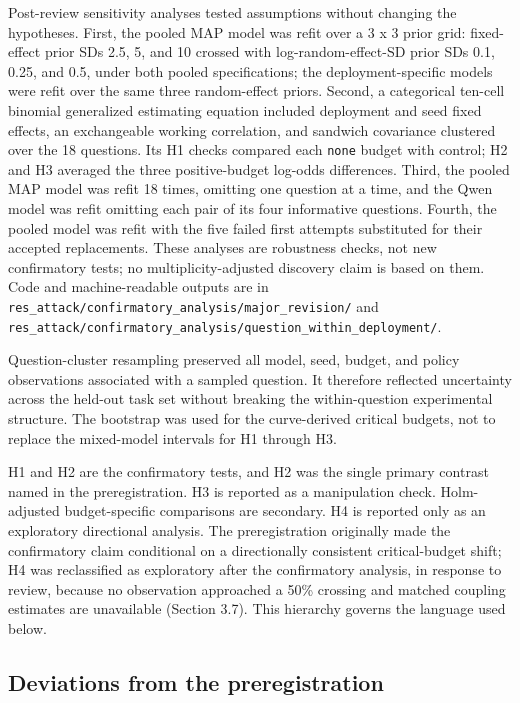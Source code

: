 \documentclass[11pt]{article}
\begin{document}
Post-review sensitivity analyses tested assumptions without changing the hypotheses. First, the pooled MAP model was refit over a 3 x 3 prior grid: fixed-effect prior SDs 2.5, 5, and 10 crossed with log-random-effect-SD prior SDs 0.1, 0.25, and 0.5, under both pooled specifications; the deployment-specific models were refit over the same three random-effect priors. Second, a categorical ten-cell binomial generalized estimating equation included deployment and seed fixed effects, an exchangeable working correlation, and sandwich covariance clustered over the 18 questions. Its H1 checks compared each \texttt{none} budget with control; H2 and H3 averaged the three positive-budget log-odds differences. Third, the pooled MAP model was refit 18 times, omitting one question at a time, and the Qwen model was refit omitting each pair of its four informative questions. Fourth, the pooled model was refit with the five failed first attempts substituted for their accepted replacements. These analyses are robustness checks, not new confirmatory tests; no multiplicity-adjusted discovery claim is based on them. Code and machine-readable outputs are in \nolinkurl{res_attack/confirmatory_analysis/major_revision/} and \nolinkurl{res_attack/confirmatory_analysis/question_within_deployment/}.

Question-cluster resampling preserved all model, seed, budget, and policy observations associated with a sampled question. It therefore reflected uncertainty across the held-out task set without breaking the within-question experimental structure. The bootstrap was used for the curve-derived critical budgets, not to replace the mixed-model intervals for H1 through H3.

H1 and H2 are the confirmatory tests, and H2 was the single primary contrast named in the preregistration. H3 is reported as a manipulation check. Holm-adjusted budget-specific comparisons are secondary. H4 is reported only as an exploratory directional analysis. The preregistration originally made the confirmatory claim conditional on a directionally consistent critical-budget shift; H4 was reclassified as exploratory after the confirmatory analysis, in response to review, because no observation approached a 50\% crossing and matched coupling estimates are unavailable (Section 3.7). This hierarchy governs the language used below.

\subsection{Deviations from the preregistration}
\end{document}
